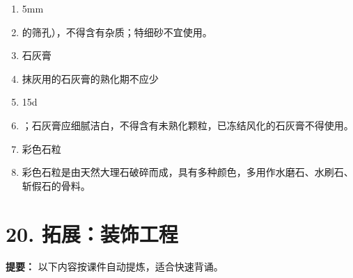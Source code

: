\documentclass[UTF8,fontset=fandol,11pt]{ctexart}
\begin{document}
\begin{enumerate}[label=\arabic*.]
\item 5mm

\item 的筛孔），不得含有杂质；特细砂不宜使用。

\item 石灰膏

\item 抹灰用的石灰膏的熟化期不应少

\item 15d

\item ；石灰膏应细腻洁白，不得含有未熟化颗粒，已冻结风化的石灰膏不得使用。

\item 彩色石粒

\item 彩色石粒是由天然大理石破碎而成，具有多种颜色，多用作水磨石、水刷石、斩假石的骨料。

\end{enumerate}

\newpage

\section*{20. 拓展：装饰工程}


\begin{mainbox}

\textbf{提要：} 以下内容按课件自动提炼，适合快速背诵。

\end{mainbox}
\end{document}
